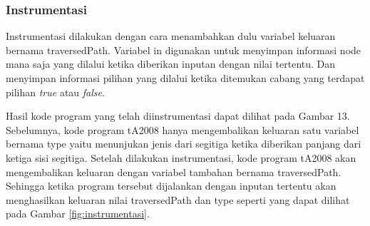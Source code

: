 \subsubsection*{Instrumentasi}
Instrumentasi dilakukan dengan cara menambahkan dulu variabel keluaran bernama traversedPath. Variabel in digunakan untuk menyimpan informasi node mana saja yang dilalui ketika diberikan inputan dengan nilai tertentu. Dan menyimpan informasi pilihan yang dilalui ketika ditemukan cabang yang terdapat pilihan \textit{true} atau \textit{false}.

Hasil kode program yang telah diinstrumentasi dapat dilihat pada Gambar 13. Sebelumnya, kode program tA2008 hanya mengembalikan keluaran satu variabel bernama type yaitu menunjukan jenis dari segitiga ketika diberikan panjang dari ketiga sisi segitiga. Setelah dilakukan instrumentasi, kode program tA2008 akan mengembalikan keluaran dengan variabel tambahan bernama traversedPath.  Sehingga ketika program tersebut dijalankan dengan inputan tertentu akan menghasilkan keluaran nilai traversedPath dan type seperti yang dapat dilihat pada Gambar \ref{fig:instrumentasi}.

